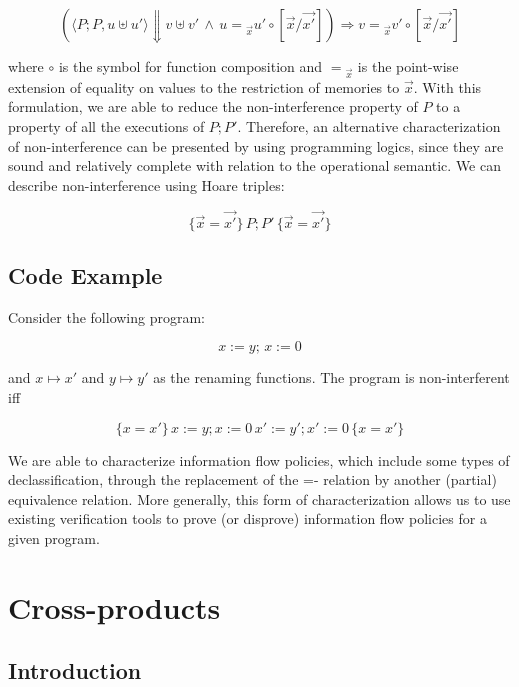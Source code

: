 \[ (\langle P; P, u \uplus u' \rangle \Downarrow v \uplus v' \, \land \, u = {}_{\overrightarrow{x}} u' \circ [\overrightarrow{x} / \overrightarrow{x'}]) \Rightarrow v = {}_{\overrightarrow{x}} v' \circ [\overrightarrow{x} / \overrightarrow{x'}] \]

where $\circ$ is the symbol for function composition and \(= {}_{\overrightarrow{x}}\) is the point-wise extension of equality on values to the restriction of memories to $\overrightarrow{x}$.
With this formulation, we are able to reduce the non-interference property of \(P\) to a property of all the executions of \(P; P'\).
Therefore, an alternative characterization of non-interference can be presented by using programming logics, since they are sound and relatively complete with relation to the operational semantic.
We can describe non-interference using Hoare triples:

\[ \{\overrightarrow{x} = \overrightarrow{x'}\} \, P; P' \, \{\overrightarrow{x} = \overrightarrow{x'}\} \]


\subsection{Code Example}
\label{subsec:self_composition_example}

Consider the following program:

\[ x := y; \, x := 0 \]

and \(x \mapsto x'\) and \(y \mapsto y'\) as the renaming functions. 
The program is non-interferent iff

\[ \{x = x'\} \, x := y; x := 0 \, x' := y'; x' := 0 \, \{x = x'\} \]

We are able to characterize information flow policies, which include some types of declassification, through the replacement of the =- relation by another (partial) equivalence relation.
More generally, this form of characterization allows us to use existing verification tools to prove (or disprove) information flow policies for a given program.


\FloatBarrier
\section{Cross-products} 
\label{sec:cross_products}

\subsection{Introduction} 
\label{subsec:cross_products_intro}

